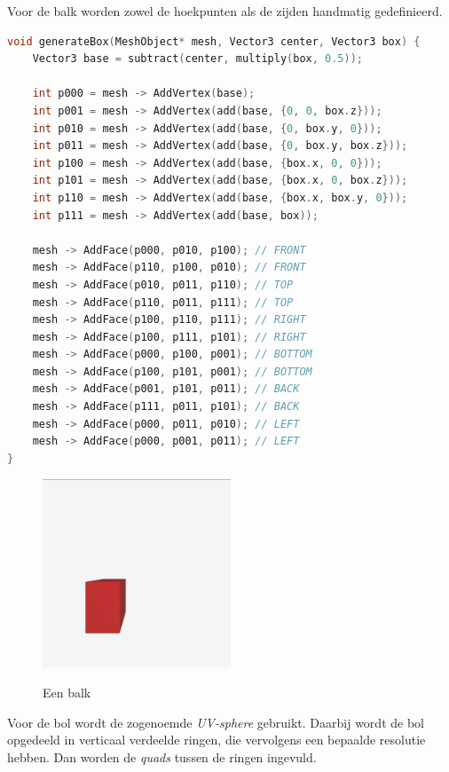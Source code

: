 \documentclass[12pt, a4paper]{article}
\begin{document}
Voor de balk worden zowel de hoekpunten als de zijden handmatig gedefinieerd.

\begin{lstlisting}[language=c++]
void generateBox(MeshObject* mesh, Vector3 center, Vector3 box) {
	Vector3 base = subtract(center, multiply(box, 0.5));
	
	int p000 = mesh -> AddVertex(base);
	int p001 = mesh -> AddVertex(add(base, {0, 0, box.z}));
	int p010 = mesh -> AddVertex(add(base, {0, box.y, 0}));
	int p011 = mesh -> AddVertex(add(base, {0, box.y, box.z}));
	int p100 = mesh -> AddVertex(add(base, {box.x, 0, 0}));
	int p101 = mesh -> AddVertex(add(base, {box.x, 0, box.z}));
	int p110 = mesh -> AddVertex(add(base, {box.x, box.y, 0}));
	int p111 = mesh -> AddVertex(add(base, box));
	
	mesh -> AddFace(p000, p010, p100); // FRONT
	mesh -> AddFace(p110, p100, p010); // FRONT
	mesh -> AddFace(p010, p011, p110); // TOP
	mesh -> AddFace(p110, p011, p111); // TOP
	mesh -> AddFace(p100, p110, p111); // RIGHT
	mesh -> AddFace(p100, p111, p101); // RIGHT
	mesh -> AddFace(p000, p100, p001); // BOTTOM
	mesh -> AddFace(p100, p101, p001); // BOTTOM
	mesh -> AddFace(p001, p101, p011); // BACK
	mesh -> AddFace(p111, p011, p101); // BACK
	mesh -> AddFace(p000, p011, p010); // LEFT
	mesh -> AddFace(p000, p001, p011); // LEFT
}
\end{lstlisting}

\begin{figure}[H]
	\centering
	\includegraphics[width=0.50\textwidth]{renders/test_002_mesh.png}
	\label{fig:box_mesh}
	\caption{Een balk}
\end{figure}

Voor de bol wordt de zogenoemde \textit{UV-sphere} gebruikt. %
Daarbij wordt de bol opgedeeld in verticaal verdeelde ringen, die vervolgens een bepaalde resolutie hebben. Dan worden de \textit{quads} tussen de ringen ingevuld.
\end{document}

